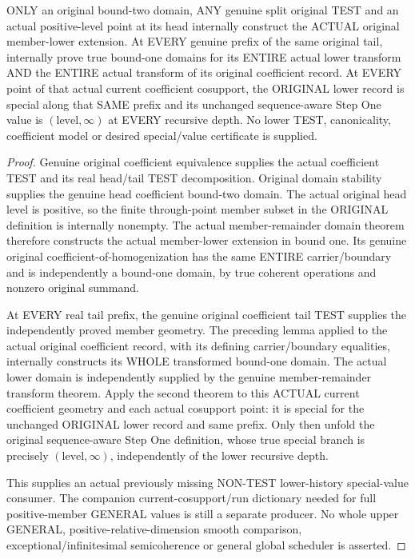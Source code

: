 \begin{theorem}
\label{hir:original-positive-member-untested-curve-stepone-leaves}
\leanok
ONLY an original bound-two domain, ANY genuine split original TEST and
an actual positive-level point at its head internally construct the
ACTUAL original member-lower extension. At EVERY genuine prefix of the
same original tail, internally prove true bound-one domains for its
ENTIRE actual lower transform AND the ENTIRE actual transform of its
original coefficient record. At EVERY point of that actual current
coefficient cosupport, the ORIGINAL lower record is special along that
SAME prefix and its unchanged sequence-aware Step One value is
$(\mathrm{level},\infty)$ at EVERY recursive depth. No lower TEST,
canonicality, coefficient model or desired special/value certificate
is supplied.
\end{theorem}
\begin{proof}
Genuine original coefficient equivalence supplies the actual coefficient
TEST and its real head/tail TEST decomposition. Original domain
stability supplies the genuine head coefficient bound-two domain. The
actual original head level is positive, so the finite through-point
member subset in the ORIGINAL definition is internally nonempty.
The actual member-remainder domain theorem therefore constructs the
actual member-lower extension in bound one. Its genuine original
coefficient-of-homogenization has the same ENTIRE carrier/boundary and
is independently a bound-one domain, by true coherent operations and
nonzero original summand.

At EVERY real tail prefix, the genuine original coefficient tail TEST
supplies the independently proved member geometry. The preceding lemma
applied to the actual original coefficient record, with its defining
carrier/boundary equalities, internally constructs its WHOLE transformed
bound-one domain. The actual lower domain is independently supplied
by the genuine member-remainder transform theorem. Apply the second
theorem to this ACTUAL current coefficient geometry and each actual
cosupport point: it is special for the unchanged ORIGINAL lower record
and same prefix. Only then unfold the original sequence-aware Step One
definition, whose true special branch is precisely
$(\mathrm{level},\infty)$, independently of the lower recursive depth.

This supplies an actual previously missing NON-TEST lower-history
special-value consumer. The companion current-cosupport/run dictionary
needed for full positive-member GENERAL values is still a separate
producer. No whole upper GENERAL, positive-relative-dimension smooth
comparison, exceptional/infinitesimal semicoherence or general global
scheduler is asserted.
\end{proof}

